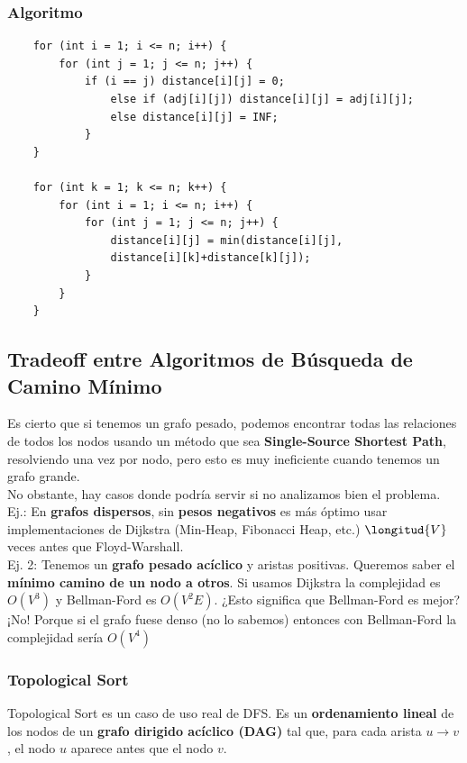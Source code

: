 \documentclass[10pt,a4paper]{article}
\begin{document}
\subsubsection*{Algoritmo}
\begin{lstlisting}
    for (int i = 1; i <= n; i++) {
        for (int j = 1; j <= n; j++) {
            if (i == j) distance[i][j] = 0;
                else if (adj[i][j]) distance[i][j] = adj[i][j];
                else distance[i][j] = INF;
            }
    }

    for (int k = 1; k <= n; k++) {
        for (int i = 1; i <= n; i++) {
            for (int j = 1; j <= n; j++) {
                distance[i][j] = min(distance[i][j],
                distance[i][k]+distance[k][j]);
            }
        }
    }
\end{lstlisting}
\subsection*{Tradeoff entre Algoritmos de Búsqueda de Camino Mínimo}
\label{subsec:tradeoff_busqueda}
Es cierto que si tenemos un grafo pesado, podemos encontrar todas las relaciones de todos los nodos usando un método que sea \textbf{Single-Source Shortest Path}, resolviendo una vez por nodo, pero esto es muy ineficiente cuando tenemos un grafo grande. \\
No obstante, hay casos donde podría servir si no analizamos bien el problema. \\
Ej.: En \textbf{grafos dispersos}, sin \textbf{pesos negativos} es más óptimo usar implementaciones de Dijkstra (Min-Heap, Fibonacci Heap, etc.) $\longitud{V}$ veces antes que Floyd-Warshall. \\
Ej. 2: Tenemos un \textbf{grafo pesado acíclico} y aristas positivas. Queremos saber el \textbf{mínimo camino de un nodo a otros}. Si usamos Dijkstra la complejidad es \textbf{$O(V^{3})$} y Bellman-Ford es $O(V^{2}E)$. ¿Esto significa que Bellman-Ford es mejor? ¡No! Porque si el grafo fuese denso (no lo sabemos) entonces con Bellman-Ford la complejidad sería $O(V^{4})$
\subsubsection*{Topological Sort}
\label{subsubsec:topological_sort}
Topological Sort es un caso de uso real de DFS. Es un \textbf{ordenamiento lineal} de los nodos de un \textbf{grafo dirigido acíclico (DAG)} tal que, para cada arista $u \rightarrow v$, el nodo $u$ aparece antes que el nodo $v$. \\
\end{document}
